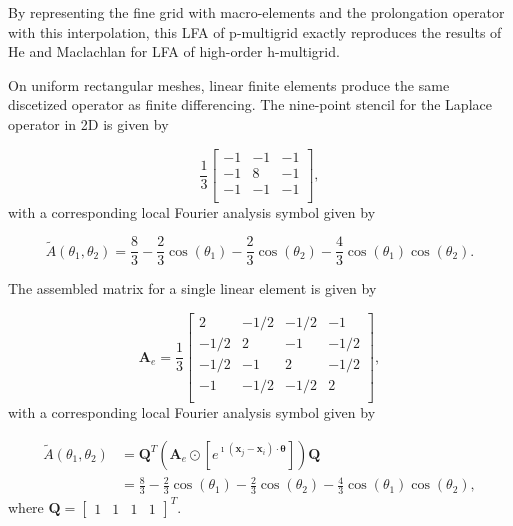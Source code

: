 \documentclass[review]{siamart190516}
\begin{document}
By representing the fine grid with macro-elements and the prolongation operator with this interpolation, this LFA of p-multigrid exactly reproduces the results of He and Maclachlan \cite{he2020two} for LFA of high-order h-multigrid.

On uniform rectangular meshes, linear finite elements produce the same discetized operator as finite differencing.
The nine-point stencil for the Laplace operator in 2D is given by

\begin{equation}
\frac{1}{3}
\begin{bmatrix}
-1  &  -1  &  -1  \\
-1  &   8  &  -1  \\
-1  &  -1  &  -1  \\
\end{bmatrix},
\end{equation}
with a corresponding local Fourier analysis symbol given by

\begin{equation}
\tilde{A} \left( \theta_1, \theta_2 \right) = \frac{8}{3} - \frac{2}{3} \cos \left( \theta_1 \right) - \frac{2}{3} \cos \left( \theta_2 \right) - \frac{4}{3} \cos \left( \theta_1 \right) \cos \left( \theta_2 \right).
\end{equation}

The assembled matrix for a single linear element is given by

\begin{equation}
\mathbf{A}_e =
\frac{1}{3}
\begin{bmatrix}
 2    &  -1/2  &  -1/2  &  -1    \\
-1/2  &   2    &  -1    &  -1/2  \\
-1/2  &  -1    &   2    &  -1/2  \\
-1    &  -1/2  &  -1/2  &   2    \\
\end{bmatrix},
\end{equation}
with a corresponding local Fourier analysis symbol given by

\begin{equation}
\begin{split}
\tilde{A} \left( \theta_1, \theta_2 \right) & = \mathbf{Q}^T \left( \mathbf{A}_e \odot \left[ e^{\imath \left( \mathbf{x}_j - \mathbf{x}_i \right) \cdot \boldsymbol{\theta}} \right] \right) \mathbf{Q}\\ & = \frac{8}{3} - \frac{2}{3} \cos \left( \theta_1 \right) - \frac{2}{3} \cos \left( \theta_2 \right) - \frac{4}{3} \cos \left( \theta_1 \right) \cos \left( \theta_2 \right),
\end{split}
\end{equation}
where $\mathbf{Q} = \begin{bmatrix} 1 & 1 & 1 & 1 \end{bmatrix}^T$.
\end{document}

